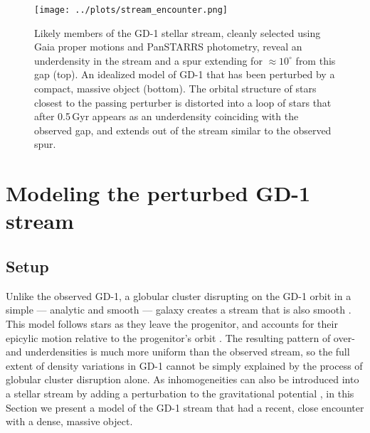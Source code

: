 \documentclass[twocolumn]{aastex62}
\begin{document}
\begin{figure}
\begin{center}
\texttt{[image: ../plots/stream\_encounter.png]}
\end{center}
\caption{Likely members of the GD-1 stellar stream, cleanly selected using Gaia proper motions and PanSTARRS photometry, reveal an underdensity in the stream and a spur extending for $\approx10^\circ$ from this gap (top).
An idealized model of GD-1 that has been perturbed by a compact, massive object (bottom).
The orbital structure of stars closest to the passing perturber is distorted into a loop of stars that after 0.5\,Gyr appears as an underdensity coinciding with the observed gap, and extends out of the stream similar to the observed spur.
}
\label{fig:fiducial}
\end{figure}

\section{Modeling the perturbed GD-1 stream}
\subsection{Setup}
\label{sec:model}
Unlike the observed GD-1, a globular cluster disrupting on the GD-1 orbit in a simple --- analytic and smooth --- galaxy creates a stream that is also smooth \citep{pwb}.
This model follows stars as they leave the progenitor, and accounts for their epicylic motion relative to the progenitor's orbit \citep{kupper2008, kupper2010, fardal2015}.
The resulting pattern of over- and underdensities is much more uniform than the observed stream, so the full extent of density variations in GD-1 cannot be simply explained by the process of globular cluster disruption alone.
As inhomogeneities can also be introduced into a stellar stream by adding a perturbation to the gravitational potential \citep[e.g.,][]{sgv2008}, in this Section we present a model of the GD-1 stream that had a recent, close encounter with a dense, massive object.
\end{document}
